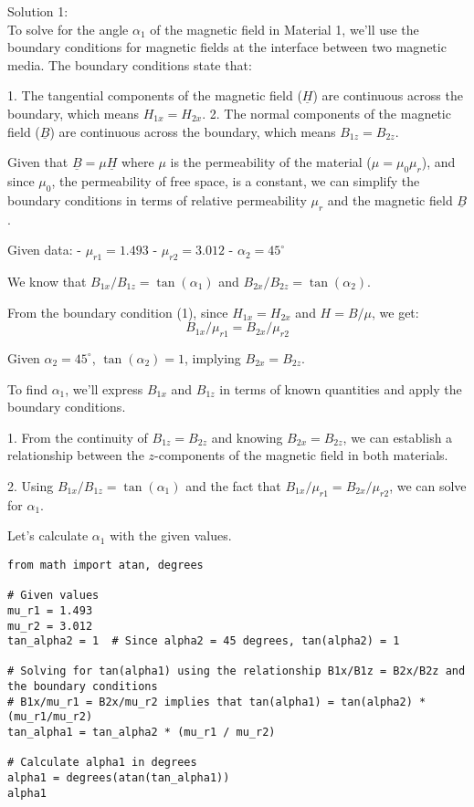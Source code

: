 \documentclass[a4paper,11pt]{article}
\begin{document}
\bigskip

\noindent Solution 1: \\

To solve for the angle \( \alpha_{1} \) of the magnetic field in Material 1, we'll use the boundary conditions for magnetic fields at the interface between two magnetic media. The boundary conditions state that:

1. The tangential components of the magnetic field (\( \underline{H} \)) are continuous across the boundary, which means \( H_{1x} = H_{2x} \).
2. The normal components of the magnetic field (\( \underline{B} \)) are continuous across the boundary, which means \( B_{1z} = B_{2z} \).

Given that \( \underline{B} = \mu \underline{H} \) where \( \mu \) is the permeability of the material (\( \mu = \mu_0 \mu_r \)), and since \( \mu_0 \), the permeability of free space, is a constant, we can simplify the boundary conditions in terms of relative permeability \( \mu_r \) and the magnetic field \( \underline{B} \).

Given data:
- \( \mu_{r1} = 1.493 \)
- \( \mu_{r2} = 3.012 \)
- \( \alpha_{2} = 45^\circ \)

We know that \( B_{1x}/B_{1z} = \tan(\alpha_{1}) \) and \( B_{2x}/B_{2z} = \tan(\alpha_{2}) \).

From the boundary condition (1), since \( H_{1x} = H_{2x} \) and \( H = B/\mu \), we get:
\[ B_{1x}/\mu_{r1} = B_{2x}/\mu_{r2} \]

Given \( \alpha_{2} = 45^\circ \), \( \tan(\alpha_{2}) = 1 \), implying \( B_{2x} = B_{2z} \).

To find \( \alpha_{1} \), we'll express \( B_{1x} \) and \( B_{1z} \) in terms of known quantities and apply the boundary conditions.

1. From the continuity of \( B_{1z} = B_{2z} \) and knowing \( B_{2x} = B_{2z} \), we can establish a relationship between the \( z \)-components of the magnetic field in both materials.

2. Using \( B_{1x}/B_{1z} = \tan(\alpha_{1}) \) and the fact that \( B_{1x}/\mu_{r1} = B_{2x}/\mu_{r2} \), we can solve for \( \alpha_{1} \).

Let's calculate \( \alpha_{1} \) with the given values.

\begin{verbatim}
from math import atan, degrees

# Given values
mu_r1 = 1.493
mu_r2 = 3.012
tan_alpha2 = 1  # Since alpha2 = 45 degrees, tan(alpha2) = 1

# Solving for tan(alpha1) using the relationship B1x/B1z = B2x/B2z and the boundary conditions
# B1x/mu_r1 = B2x/mu_r2 implies that tan(alpha1) = tan(alpha2) * (mu_r1/mu_r2)
tan_alpha1 = tan_alpha2 * (mu_r1 / mu_r2)

# Calculate alpha1 in degrees
alpha1 = degrees(atan(tan_alpha1))
alpha1
\end{verbatim}
\end{document}
